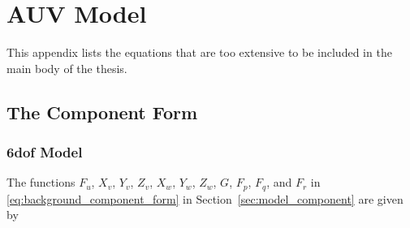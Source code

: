 \chapter{AUV Model}
This appendix lists the equations that are too extensive to be included in the main body of the thesis.
\allowdisplaybreaks

\section{The Component Form}
\label{app:component_form}
\subsection{6\gls{dof} Model}
The functions $F_u$, $X_v$, $Y_v$, $Z_v$, $X_w$, $Y_w$, $Z_w$, $G$, $F_p$, $F_q$, and $F_r$ in \eqref{eq:background_component_form} in Section~\ref{sec:model_component} are given by
